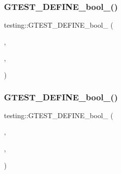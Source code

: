 \subsubsection{\texorpdfstring{G\+T\+E\+S\+T\+\_\+\+D\+E\+F\+I\+N\+E\+\_\+bool\+\_\+()}{GTEST\_DEFINE\_bool\_()}\hspace{0.1cm}{\footnotesize\ttfamily [7/9]}}
{\footnotesize\ttfamily testing\+::\+G\+T\+E\+S\+T\+\_\+\+D\+E\+F\+I\+N\+E\+\_\+bool\+\_\+ (\begin{DoxyParamCaption}\item[{show\+\_\+internal\+\_\+stack\+\_\+frames}]{,  }\item[{false}]{,  }\item[{\char`\"{}True iff \char`\"{} G\+T\+E\+S\+T\+\_\+\+N\+A\+M\+E\+\_\+ \char`\"{} should include internal stack frames when \char`\"{} \char`\"{}printing test failure stack traces.\char`\"{}}]{ }\end{DoxyParamCaption})}

\mbox{\label{namespacetesting_af95276e3deb9d243d729f3043eabd272}} 
\subsubsection{\texorpdfstring{G\+T\+E\+S\+T\+\_\+\+D\+E\+F\+I\+N\+E\+\_\+bool\+\_\+()}{GTEST\_DEFINE\_bool\_()}\hspace{0.1cm}{\footnotesize\ttfamily [8/9]}}
{\footnotesize\ttfamily testing\+::\+G\+T\+E\+S\+T\+\_\+\+D\+E\+F\+I\+N\+E\+\_\+bool\+\_\+ (\begin{DoxyParamCaption}\item[{shuffle}]{,  }\item[{\hyperlink{namespacetesting_1_1internal_a67132cdce23fb71b6c38ee34ef81eb4c}{internal\+::\+Bool\+From\+G\+Test\+Env}(\char`\"{}shuffle\char`\"{}, false)}]{,  }\item[{\char`\"{}True iff \char`\"{} G\+T\+E\+S\+T\+\_\+\+N\+A\+M\+E\+\_\+ \char`\"{} should randomize tests\textquotesingle{} order on every run.\char`\"{}}]{ }\end{DoxyParamCaption})}

\mbox{\label{namespacetesting_a7598962574c3fff25237b78f0de81aa7}} 
